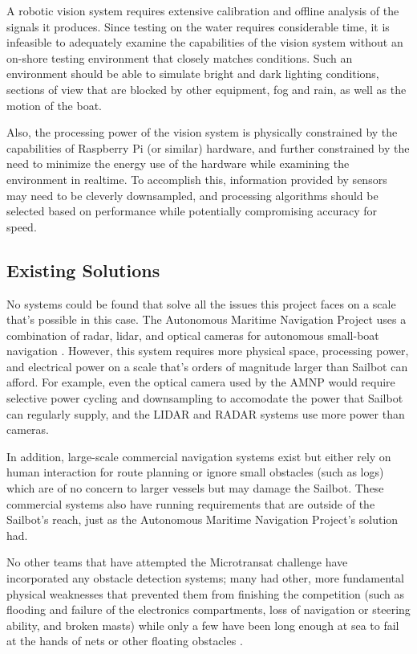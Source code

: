 A robotic vision system requires extensive calibration and offline analysis of the signals it produces. Since testing on the water requires considerable time, it is infeasible to adequately examine the capabilities of the vision system without an on-shore testing environment that closely matches conditions. Such an environment should be able to simulate bright and dark lighting conditions, sections of view that are blocked by other equipment, fog and rain, as well as the motion of the boat.

Also, the processing power of the vision system is physically constrained by the capabilities of Raspberry Pi (or similar) hardware, and further constrained by the need to minimize the energy use of the hardware while examining the environment in realtime. To accomplish this, information provided by sensors may need to be cleverly downsampled, and processing algorithms should be selected based on performance while potentially compromising accuracy for speed.


\subsection{\label{sec:intro:existing-solutions}Existing Solutions}
No systems could be found that solve all the issues this project faces on a scale that's possible in this case. The Autonomous Maritime Navigation Project uses a combination of radar, lidar, and optical cameras for autonomous small-boat navigation \cite{AMN}. However, this system requires more physical space, processing power, and electrical power on a scale that's orders of magnitude larger than Sailbot can afford. For example, even the optical camera used by the AMNP would require selective power cycling and downsampling to accomodate the power that Sailbot can regularly supply, and the LIDAR and RADAR systems use more power than cameras.

In addition, large-scale commercial navigation systems exist but either rely on human interaction for route planning or ignore small obstacles (such as logs) which are of no concern to larger vessels but may damage the Sailbot. These commercial systems also have running requirements that are outside of the Sailbot's reach, just as the Autonomous Maritime Navigation Project's solution had. 

No other teams that have attempted the Microtransat challenge have incorporated any obstacle detection systems; many had other, more fundamental physical weaknesses that prevented them from finishing the competition (such as flooding and failure of the electronics compartments, loss of navigation or steering ability, and broken masts) while only a few have been long enough at sea to fail at the hands of nets or other floating obstacles \cite{transat-history}.


